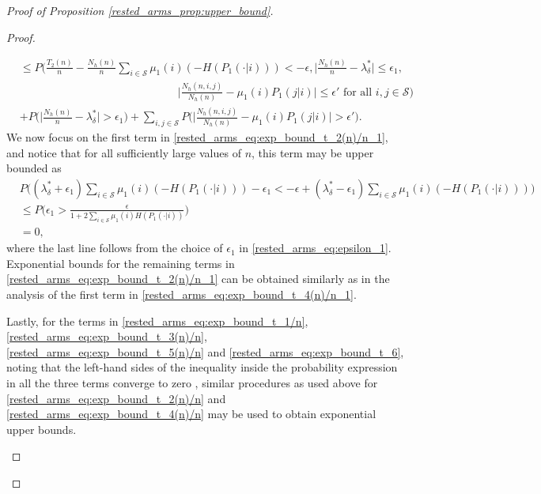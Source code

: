 \begin{proof}[Proof of Proposition \ref{rested_arms_prop:upper_bound}]
\begin{proof}
\begin{enumerate}
\begin{align}
	&\leq P\bigg(\frac{T_2(n)}{n}-\frac{N_h(n)}{n}\sum\limits_{i\in\mathcal{S}}\mu_1(i)(-H(P_1(\cdot|i)))<-\epsilon,
	\bigg\vert\frac{N_h(n)}{n}-\lambda_\delta^*\bigg\vert\leq\epsilon_1,\nonumber\\
	&\hspace{6cm}
	\bigg\vert\frac{N_h(n,i,j)}{N_h(n)}-\mu_1(i)P_1(j|i)\bigg\vert\leq\epsilon'\text{ for all }i,j\in\mathcal{S}\bigg)\nonumber\\
	&+P\bigg(\bigg\vert\frac{N_h(n)}{n}-\lambda_\delta^*\bigg\vert>\epsilon_1\bigg)+\sum\limits_{i,j\in\mathcal{S}}P\bigg(\bigg\vert\frac{N_h(n,i,j)}{N_h(n)}-\mu_1(i)P_1(j|i)\bigg\vert>\epsilon'\bigg).\label{rested_arms_eq:exp_bound_t_2(n)/n_1}
\end{align}\endgroup
We now focus on the first term in \eqref{rested_arms_eq:exp_bound_t_2(n)/n_1}, and notice that for all sufficiently large values of $n$, this term may be upper bounded as
\begingroup\allowdisplaybreaks\begin{align}
	&P\bigg((\lambda_\delta^*+\epsilon_1)\sum\limits_{i\in\mathcal{S}}\mu_1(i)(-H(P_1(\cdot|i)))-\epsilon_1
	<-\epsilon+(\lambda_\delta^*-\epsilon_1)\sum\limits_{i\in\mathcal{S}}\mu_1(i)(-H(P_1(\cdot|i)))\bigg)\nonumber\\
	&\leq P\bigg(\epsilon_1>\frac{\epsilon}{1+2\sum\limits_{i\in\mathcal{S}}\mu_1(i)H(P_1(\cdot|i))}\bigg)\nonumber\\
	&=0,
\end{align}\endgroup
where the last line follows from the choice of $\epsilon_1$ in \eqref{rested_arms_eq:epsilon_1}. Exponential bounds for the remaining terms in \eqref{rested_arms_eq:exp_bound_t_2(n)/n_1} can be obtained similarly as in the analysis of the first term in \eqref{rested_arms_eq:exp_bound_t_4(n)/n_1}.

Lastly, for the terms in \eqref{rested_arms_eq:exp_bound_t_1/n}, \eqref{rested_arms_eq:exp_bound_t_3(n)/n},  \eqref{rested_arms_eq:exp_bound_t_5(n)/n} and \eqref{rested_arms_eq:exp_bound_t_6}, noting that the left-hand sides of the inequality inside the probability expression in all the three terms converge to zero , similar procedures as used above for \eqref{rested_arms_eq:exp_bound_t_2(n)/n} and \eqref{rested_arms_eq:exp_bound_t_4(n)/n} may be used to obtain exponential upper bounds.


\end{enumerate}
\end{proof}
\end{proof}
